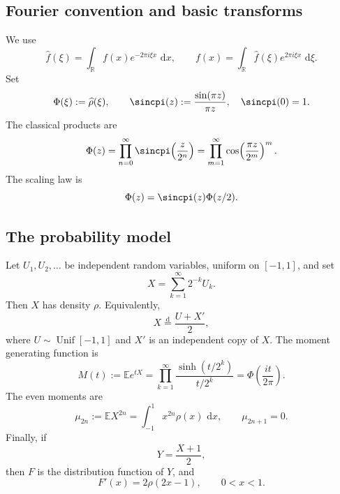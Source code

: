 \documentclass[11pt,oneside]{article}
\theoremstyle{definition}
\newcommand{\dd}{\,\mathrm d}
\newcommand{\E}{\mathbb E}
\newcommand{\R}{\mathbb R}
\begin{document}
\subsection{Fourier convention and basic transforms}

We use
\begin{equation}
 \widehat f(\xi)=\int_{\R}f(x)e^{-2\pi i\xi x}\,\dd x,
 \qquad
 f(x)=\int_{\R}\widehat f(\xi)e^{2\pi i\xi x}\,\dd\xi.       \label{p3:eq:fourier-convention}
\end{equation}
Set
\begin{equation}
 \Phi(\xi):=\widehat\rho(\xi),
 \qquad
 \sincpi(z):=\frac{\sin(\pi z)}{\pi z},\quad \sincpi(0)=1. \label{p3:eq:Phi-def}
\end{equation}
The classical products are
\begin{equation}
 \Phi(z)=\prod_{n=0}^{\infty}\sincpi\!\left(\frac{z}{2^n}\right)
 =\prod_{m=1}^{\infty}\cos\!\left(\frac{\pi z}{2^m}\right)^m. \label{p3:eq:Phi-products}
\end{equation}
The scaling law is
\begin{equation}
 \Phi(z)=\sincpi(z)\Phi(z/2).                                \label{p3:eq:Phi-scaling}
\end{equation}

\subsection{The probability model}

Let \(U_1,U_2,\dots\) be independent random variables, uniform on \([-1,1]\), and set
\begin{equation}
 X=\sum_{k=1}^{\infty}2^{-k}U_k.                              \label{p3:eq:X-series}
\end{equation}
Then \(X\) has density \(\rho\).  Equivalently,
\begin{equation}
 X\overset{\mathrm d}=\frac{U+X'}2,                           \label{p3:eq:X-fixed-point}
\end{equation}
where \(U\sim\operatorname{Unif}[-1,1]\) and \(X'\) is an independent copy of \(X\).
The moment generating function is
\begin{equation}
 M(t):=\E e^{tX}
 =\prod_{k=1}^{\infty}\frac{\sinh(t/2^k)}{t/2^k}
 =\Phi\!\left(\frac{it}{2\pi}\right).                       \label{p3:eq:M-product}
\end{equation}
The even moments are
\begin{equation}
 \mu_{2n}:=\E X^{2n}=\int_{-1}^{1}x^{2n}\rho(x)\,\dd x,
 \qquad \mu_{2n+1}=0.                                      \label{p3:eq:moments}
\end{equation}
Finally, if
\begin{equation}
 Y=\frac{X+1}{2},                                             \label{p3:eq:Y-affine}
\end{equation}
then \(F\) is the distribution function of \(Y\), and
\begin{equation}
 F'(x)=2\rho(2x-1),\qquad 0<x<1.                              \label{p3:eq:F-density}
\end{equation}
\end{document}
